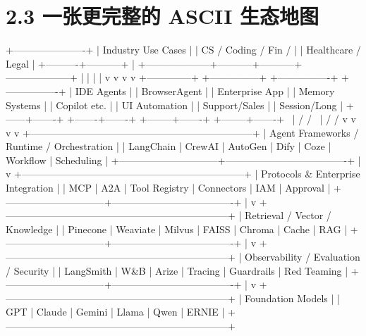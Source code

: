 \section{2.3 一张更完整的 ASCII 生态地图}

\begin{codeblock}
                              +----------------------+
                              |  Industry Use Cases  |
                              | CS / Coding / Fin /  |
                              | Healthcare / Legal   |
                              +----------+-----------+
                                         |
        +--------------------+-----------+-----------+--------------------+
        |                    |                       |                    |
        v                    v                       v                    v
 +--------------+   +---------------+     +----------------+   +----------------+
 | IDE Agents   |   | BrowserAgent  |     | Enterprise App |   | Memory Systems |
 | Copilot etc. |   | UI Automation |     | Support/Sales  |   | Session/Long   |
 +------+-------+   +-------+-------+     +--------+-------+   +--------+-------+
        \                   |                      /                    /
         \                  |                     /                    /
          v                 v                    v                    v
      +--------------------------------------------------------------------+
      | Agent Frameworks / Runtime / Orchestration                         |
      | LangChain | CrewAI | AutoGen | Dify | Coze | Workflow | Scheduling |
      +------------------------------+-------------------------------------+
                                     |
                                     v
      +--------------------------------------------------------------------+
      | Protocols & Enterprise Integration                                 |
      | MCP | A2A | Tool Registry | Connectors | IAM | Approval            |
      +------------------------------+-------------------------------------+
                                     |
                                     v
      +--------------------------------------------------------------------+
      | Retrieval / Vector / Knowledge                                     |
      | Pinecone | Weaviate | Milvus | FAISS | Chroma | Cache | RAG        |
      +------------------------------+-------------------------------------+
                                     |
                                     v
      +--------------------------------------------------------------------+
      | Observability / Evaluation / Security                              |
      | LangSmith | W&B | Arize | Tracing | Guardrails | Red Teaming       |
      +------------------------------+-------------------------------------+
                                     |
                                     v
      +--------------------------------------------------------------------+
      | Foundation Models                                                  |
      | GPT | Claude | Gemini | Llama | Qwen | ERNIE                       |
      +--------------------------------------------------------------------+
\end{codeblock}

